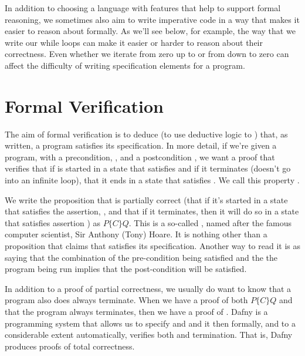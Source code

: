 \documentclass[letterpaper,10pt,english]{sphinxmanual}
\begin{document}
In addition to choosing a language with features that help to support
formal reasoning, we sometimes also aim to write imperative code in a
way that makes it easier to reason about formally. As we’ll see below,
for example, the way that we write our while loops can make it easier
or harder to reason about their correctness. Even whether we iterate
from zero up to  or from  down to zero can affect the difficulty
of writing specification elements for a program.


\section{Formal Verification}
\label{\detokenize{05-verifying-logical-specifications:formal-verification}}
The aim of formal verification is to deduce (to use deductive logic to
) that, as written, a program satisfies its specification.  In
more detail, if we’re given a program,  with a precondition, ,
and a postcondition , we want a proof that verifies that if  is
started in a state that satisfies  and if it terminates (doesn’t go
into an infinite loop), that it ends in a state that satisfies . We
call this property .

We write the proposition that  is partially correct (that if it’s
started in a state that satisfies the assertion, , and that if it
terminates, then it will do so in a state that satisfies assertion
) as \(P \{ C \} Q.\) This is a so-called , named
after the famous computer scientist, Sir Anthony (Tony) Hoare. It is
nothing other than a proposition that claims that  satisfies its
 specification. Another way to read it
is as saying that the combination of the pre-condition being satisfied
and the the program being run implies that the post-condition will be
satisfied.

In addition to a proof of partial correctness, we usually do want to
know that a program also does always terminate. When we have a proof
of both \(P \{ C \} Q\) and that the program always terminates,
then we have a proof of . Dafny is a programming
system that allows us to specify  and  and it then formally, and
to a considerable extent automatically, verifies both 
and termination.  That is, Dafny produces proofs of total correctness.
\end{document}

